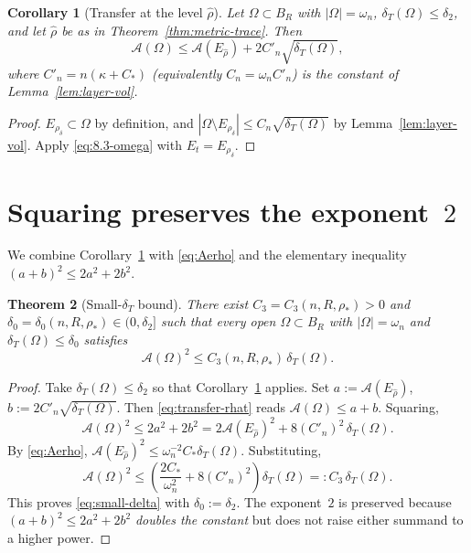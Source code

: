 \documentclass[11pt]{article}
\newtheorem{theorem}{Theorem}[section]
\newtheorem{corollary}[theorem]{Corollary}
\theoremstyle{definition}
\newcommand{\Fr}{\mathcal{A}}
\newcommand{\Om}{\Omega}
\newcommand{\rstar}{\rho_{*}}
\newcommand{\rhad}{\widehat\rho}
\begin{document}
\begin{corollary}[Transfer at the level $\rhad$]\label{cor:transfer}
Let $\Om\subset B_R$ with $|\Om|=\omega_n$,
$\delta_T(\Om)\le\delta_2$, and let $\rhad$ be as in
Theorem~\ref{thm:metric-trace}. Then
\begin{equation}\label{eq:transfer-rhat}
\Fr(\Om)\le \Fr(E_{\rhad})+2C'_n\sqrt{\delta_T(\Om)},
\end{equation}
where $C'_n=n(\kappa+C_*)$ (equivalently $C_n=\omega_n C'_n$) is the
constant of Lemma~\ref{lem:layer-vol}.
\end{corollary}

\begin{proof}
$E_{\rho_\delta}\subset\Om$ by definition, and
$|\Om\setminus E_{\rho_\delta}|\le C_n\sqrt{\delta_T(\Om)}$ by
Lemma~\ref{lem:layer-vol}. Apply \eqref{eq:8.3-omega} with
$E_t=E_{\rho_\delta}$.
\end{proof}

\section{Squaring preserves the exponent~$2$}\label{sec:squaring}

We combine Corollary~\ref{cor:transfer} with
\eqref{eq:Aerho} and the elementary inequality
$(a+b)^2\le 2a^2+2b^2$.

\begin{theorem}[Small-$\delta_T$ bound]\label{thm:small-delta}
There exist $C_3=C_3(n,R,\rstar)>0$ and
$\delta_0=\delta_0(n,R,\rstar)\in(0,\delta_2]$ such that every open
$\Om\subset B_R$ with $|\Om|=\omega_n$ and
$\delta_T(\Om)\le \delta_0$ satisfies
\begin{equation}\label{eq:small-delta}
\Fr(\Om)^{2}\le C_3(n,R,\rstar)\,\delta_T(\Om).
\end{equation}
\end{theorem}

\begin{proof}
Take $\delta_T(\Om)\le\delta_2$ so that
Corollary~\ref{cor:transfer} applies. Set
$a:=\Fr(E_{\rhad})$, $b:=2C'_n\sqrt{\delta_T(\Om)}$.
Then \eqref{eq:transfer-rhat} reads $\Fr(\Om)\le a+b$. Squaring,
\begin{equation}\label{eq:square}
\Fr(\Om)^2\le 2a^2+2b^2
=2\Fr(E_{\rhad})^2+8(C'_n)^{2}\,\delta_T(\Om).
\end{equation}
By \eqref{eq:Aerho},
$\Fr(E_{\rhad})^2\le \omega_n^{-2}C_*\delta_T(\Om)$. Substituting,
\begin{equation}\label{eq:final-const}
\Fr(\Om)^2\le \left(\frac{2C_*}{\omega_n^{2}}+8(C'_n)^{2}\right)\delta_T(\Om)
=:C_3\,\delta_T(\Om).
\end{equation}
This proves \eqref{eq:small-delta} with $\delta_0:=\delta_2$. The
exponent~$2$ is preserved because $(a+b)^2\le 2a^2+2b^2$
\emph{doubles the constant} but does not raise either summand to a
higher power.
\end{proof}
\end{document}
